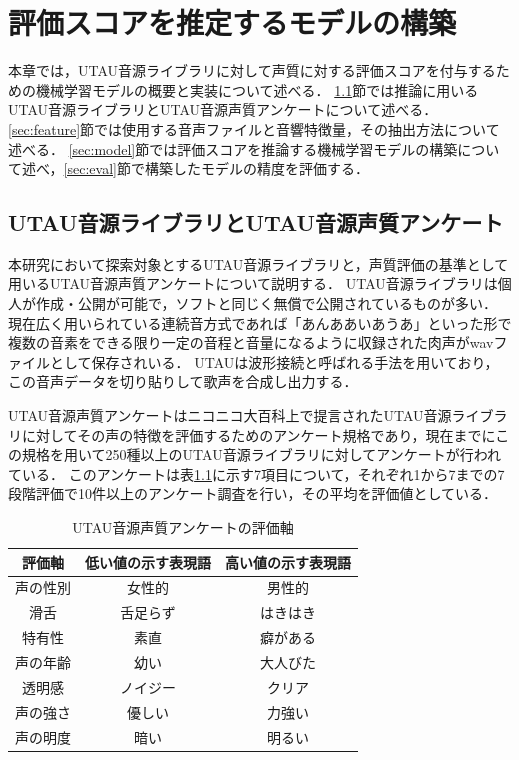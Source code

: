 \chapter{評価スコアを推定するモデルの構築}
\thispagestyle{myheadings}
\label{chap:model}

本章では，UTAU音源ライブラリに対して声質に対する評価スコアを付与するための機械学習モデルの概要と実装について述べる．
\ref{sec:utau}節では推論に用いるUTAU音源ライブラリとUTAU音源声質アンケートについて述べる．
\ref{sec:feature}節では使用する音声ファイルと音響特徴量，その抽出方法について述べる．
\ref{sec:model}節では評価スコアを推論する機械学習モデルの構築について述べ，\ref{sec:eval}節で構築したモデルの精度を評価する．

\section{UTAU音源ライブラリとUTAU音源声質アンケート}
\label{sec:utau}

本研究において探索対象とするUTAU音源ライブラリと，声質評価の基準として用いるUTAU音源声質アンケートについて説明する．
UTAU音源ライブラリは個人が作成・公開が可能で，ソフトと同じく無償で公開されているものが多い．
現在広く用いられている連続音方式であれば「あんああいあうあ」\cite{tatsu3shiki}といった形で複数の音素をできる限り一定の音程と音量になるように収録された肉声がwavファイルとして保存されいる．
UTAUは波形接続と呼ばれる手法を用いており，この音声データを切り貼りして歌声を合成し出力する．

UTAU音源声質アンケートはニコニコ大百科上で提言されたUTAU音源ライブラリに対してその声の特徴を評価するためのアンケート規格であり\cite{utausurvey}，現在までにこの規格を用いて250種以上のUTAU音源ライブラリに対してアンケートが行われている．
このアンケートは表\ref{tab:survey}に示す7項目について，それぞれ1から7までの7段階評価で10件以上のアンケート調査を行い，その平均を評価値としている．

\begin{table}[htb]
  \centering
  \caption{UTAU音源声質アンケートの評価軸}
  \label{tab:survey}
  \begin{tabular}{c|cc}
    \hline
    評価軸 & 低い値の示す表現語 & 高い値の示す表現語 \\
    \hline
    声の性別 & 女性的 & 男性的 \\
    滑舌 & 舌足らず & はきはき \\
    特有性 & 素直 & 癖がある \\
    声の年齢 & 幼い & 大人びた \\
    透明感 & ノイジー & クリア \\
    声の強さ & 優しい & 力強い \\
    声の明度 & 暗い & 明るい \\
    \hline
  \end{tabular}
\end{table}

